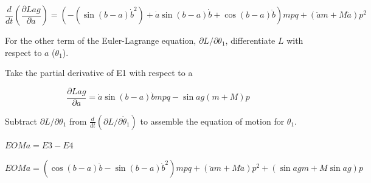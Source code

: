 \documentclass[dvipdfmx]{article}
\begin{document}
\begin{equation}
  \frac{d}{dt}\left(\frac{\partial Lag}{\partial \dot{a}}\right) = \left(-\left(\sin \left(b-a\right) \dot{b}^2\right)+\dot{a} \sin \left(b-a\right) \dot{b}+\cos \left(b-a\right) \ddot{b}\right) m p q+\left(\ddot{a} m+M \ddot{a}\right) p^2
  \label{eq:E3}
\end{equation}

For the other term of the Euler-Lagrange equation, $\partial L/\partial\theta_1$, differentiate $L$ with respect to $a$ ($\theta_1$).

Take the partial derivative of E1 with respect to a

\begin{equation}
  \frac{\partial Lag}{\partial a} = \dot{a} \sin \left(b-a\right) \dot{b} m p q-\sin a g \left(m+M\right) p
  \label{eq:E4}
\end{equation}

Subtract $\partial L/\partial\theta_1$ from $\frac{d}{dt}(\partial L/\partial\dot\theta_1)$ to assemble the equation of motion for $\theta_1$.

$EOMa = E3 - E4$

\begin{equation}
  EOMa = \left(\cos \left(b-a\right) \ddot{b}-\sin \left(b-a\right) \dot{b}^2\right) m p q+\left(\ddot{a} m+M \ddot{a}\right) p^2+\left(\sin a g m+M \sin a g\right) p
  \label{eq:E5}
\end{equation}
\end{document}
